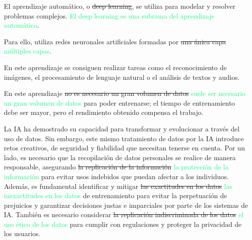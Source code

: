 

\begin{solution}

El aprendizaje automático, o \textcolor{samuraiRed}{\sout{deep learning}}, se utiliza para modelar y resolver problemas complejos. 
\textcolor{springGreen}{El deep learning es una subrama del aprendizaje automático}.

Para ello, utiliza redes neuronales artificiales formadas por \textcolor{samuraiRed}{\sout{una única capa}} \textcolor{springGreen}{múltiples capas}.

En este aprendizaje se consiguen realizar tareas como el reconocimiento de imágenes, el procesamiento de lenguaje natural o el análisis de textos y audios.

En este aprendizaje \textcolor{samuraiRed}{\sout{no es necesario un gran volumen de datos}} \textcolor{springGreen}{suele ser necesario un gran volumen de datos} para poder entrenarse; 
el tiempo de entrenamiento debe ser mayor, pero el rendimiento obtenido compensa el trabajo.
	
\vspace{2em}
\hrulefill
\vspace{2em}


La IA ha demostrado su capacidad para transformar y evolucionar a través del uso de datos. Sin embargo, este mismo tratamiento de datos por la IA introduce retos creativos, de seguridad y fiabilidad que necesitan tenerse en cuenta. Por un lado, es necesario que la recopilación de datos personales se realice de manera responsable, asegurando \textcolor{samuraiRed}{\sout{la replicación de la información}} \textcolor{springGreen}{la protección de la información} para evitar usos indebidos que puedan afectar a los individuos. Además, es fundamental identificar y mitigar \textcolor{samuraiRed}{\sout{las exactitudes en los datos}} \textcolor{springGreen}{las inexactitudes en los datos} de entrenamiento para evitar la perpetuación de prejuicios y garantizar decisiones justas e imparciales por parte de los sistemas de IA. También es necesario considerar \textcolor{samuraiRed}{\sout{la replicación indiscriminada de los datos}} \textcolor{springGreen}{el uso ético de los datos} para cumplir con regulaciones y proteger la privacidad de los usuarios.


\end{solution}
